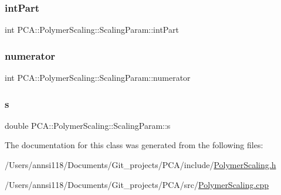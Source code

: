 \hypertarget{class_p_c_a_1_1_polymer_scaling_1_1_scaling_param_affe9bd76db73798302bda975912cd832}{}\label{class_p_c_a_1_1_polymer_scaling_1_1_scaling_param_affe9bd76db73798302bda975912cd832} 
\subsubsection{\texorpdfstring{int\+Part}{intPart}}
{\footnotesize\ttfamily int P\+C\+A\+::\+Polymer\+Scaling\+::\+Scaling\+Param\+::int\+Part}

\hypertarget{class_p_c_a_1_1_polymer_scaling_1_1_scaling_param_a44e1207125e0e834313769714699b701}{}\label{class_p_c_a_1_1_polymer_scaling_1_1_scaling_param_a44e1207125e0e834313769714699b701} 
\subsubsection{\texorpdfstring{numerator}{numerator}}
{\footnotesize\ttfamily int P\+C\+A\+::\+Polymer\+Scaling\+::\+Scaling\+Param\+::numerator}

\hypertarget{class_p_c_a_1_1_polymer_scaling_1_1_scaling_param_a56665ea41c05361e104d28e6dd440f9b}{}\label{class_p_c_a_1_1_polymer_scaling_1_1_scaling_param_a56665ea41c05361e104d28e6dd440f9b} 
\subsubsection{\texorpdfstring{s}{s}}
{\footnotesize\ttfamily double P\+C\+A\+::\+Polymer\+Scaling\+::\+Scaling\+Param\+::s}



The documentation for this class was generated from the following files\+:\begin{DoxyCompactItemize}
\item 
/\+Users/annsi118/\+Documents/\+Git\+\_\+projects/\+P\+C\+A/include/\hyperlink{_polymer_scaling_8h}{Polymer\+Scaling.\+h}\item 
/\+Users/annsi118/\+Documents/\+Git\+\_\+projects/\+P\+C\+A/src/\hyperlink{_polymer_scaling_8cpp}{Polymer\+Scaling.\+cpp}\end{DoxyCompactItemize}

